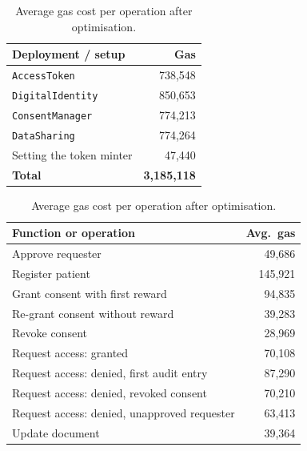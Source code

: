 \documentclass[10pt,a4paper]{article}
\begin{document}
\begin{table}[htbp]
  \centering
  \footnotesize
  \begin{minipage}[t]{0.40\linewidth}
    \centering
    \vspace{0pt}
    \begin{tabular}{lr}
      \toprule
      \textbf{Deployment / setup} & \textbf{Gas} \\
      \midrule
      \texttt{AccessToken} & 738,548 \\
      \texttt{DigitalIdentity} & 850,653 \\
      \texttt{ConsentManager} & 774,213 \\
      \texttt{DataSharing} & 774,264 \\
      Setting the token minter & 47,440 \\
      \midrule
      \textbf{Total} & \textbf{3,185,118} \\
      \bottomrule
    \end{tabular}
    \caption{Deployment and setup gas costs.}
    \label{tab:deploy}
  \end{minipage}\hfill
  \begin{minipage}[t]{0.57\linewidth}
    \centering
    \vspace{0pt}
    \begin{tabular}{lr}
      \toprule
      \textbf{Function or operation} & \textbf{Avg.\ gas} \\
      \midrule
      Approve requester & 49,686 \\
      Register patient & 145,921 \\
      Grant consent with first reward & 94,835 \\
      Re-grant consent without reward & 39,283 \\
      Revoke consent & 28,969 \\
      Request access: granted & 70,108 \\
      Request access: denied, first audit entry & 87,290 \\
      Request access: denied, revoked consent & 70,210 \\
      Request access: denied, unapproved requester & 63,413 \\
      Update document & 39,364 \\
      \bottomrule
    \end{tabular}
    \caption{Average gas cost per operation after optimisation.}
    \label{tab:gas}
  \end{minipage}
\end{table}
\end{document}
